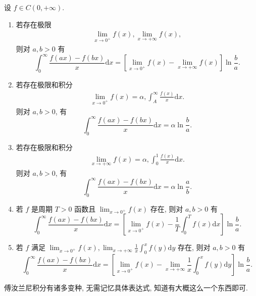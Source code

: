 \documentclass[../../main.tex]{subfiles}
\begin{document}
\begin{theorem}\label{theorem:Frullani(傅汝兰尼)积分}
设 $f \in C(0,+\infty)$.
\begin{enumerate}
\item 若存在极限
\begin{align}
\lim_{x \to 0^+} f(x), \lim_{x \to +\infty} f(x), \label{equation:::::::-----2864611---14.3}
\end{align}
则对 $a,b > 0$ 有
$$\int_0^\infty \frac{f(ax) - f(bx)}{x} \mathrm{d}x = \left[ \lim_{x \to 0^+} f(x) - \lim_{x \to +\infty} f(x) \right] \ln \frac{b}{a}.$$

\item 若存在极限和积分
\begin{align}
\lim_{x \to 0^+} f(x) = \alpha, \int_A^\infty \frac{f(x)}{x} \mathrm{d}x. \label{equation:::::::-----2864611---14.4}
\end{align}
则对 $a,b > 0$, 有
$$\int_0^\infty \frac{f(ax) - f(bx)}{x} \mathrm{d}x = \alpha \ln \frac{b}{a}.$$

\item 若存在极限和积分
\begin{align}
\lim_{x \to +\infty} f(x) = \alpha, \int_0^1 \frac{f(x)}{x} \mathrm{d}x. \label{equation:::::::-----2864611---14.5}
\end{align}
则对 $a,b > 0$, 有
$$\int_0^\infty \frac{f(ax) - f(bx)}{x} \mathrm{d}x = \alpha \ln \frac{a}{b}.$$

\item 若 $f$ 是周期 $T > 0$ 函数且 $\lim_{x \to 0^+} f(x)$ 存在, 则对 $a,b > 0$ 有
$$\int_0^\infty \frac{f(ax) - f(bx)}{x} \mathrm{d}x = \left[ \lim_{x \to 0^+} f(x) - \frac{1}{T} \int_0^T f(x) \mathrm{d}x \right] \ln \frac{b}{a}.$$

\item 若 $f$ 满足 $\lim_{x \to 0^+} f(x), \lim_{x \to +\infty} \frac{1}{x} \int_0^x f(y) \mathrm{d}y$ 存在, 则对 $a,b > 0$ 有
$$\int_0^\infty \frac{f(ax) - f(bx)}{x} \mathrm{d}x = \left[ \lim_{x \to 0^+} f(x) - \lim_{x \to +\infty} \frac{1}{x} \int_0^x f(y) \mathrm{d}y \right] \ln \frac{b}{a}.$$
\end{enumerate}
\end{theorem}
\begin{note}
傅汝兰尼积分有诸多变种, 无需记忆具体表达式, 知道有大概这么一个东西即可.
\end{note}
\end{document}
